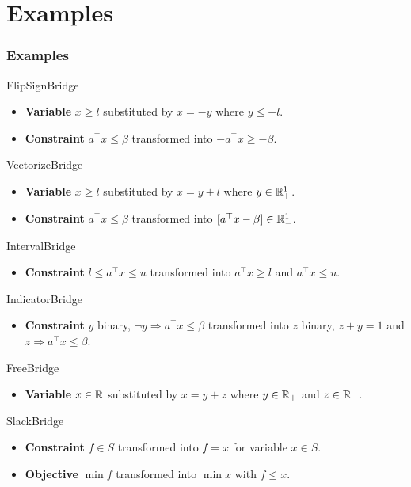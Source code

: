 \documentclass{beamer}
\begin{document}
\section{Examples}

  \begin{frame}[allowframebreaks]
    \frametitle{Examples}
    \begin{block}{FlipSignBridge}
      \begin{itemize}
        \item \textbf{Variable} $x \ge l$ substituted by $x = -y$ where $y \le -l$.
        \item \textbf{Constraint} $a^\top x \le \beta$ transformed into $-a^\top x \ge -\beta$.
      \end{itemize}
    \end{block}
    \begin{block}{VectorizeBridge}
      \begin{itemize}
        \item \textbf{Variable} $x \ge l$ substituted by $x = y + l$ where $y \in \mathbb{R}^1_+$.
        \item \textbf{Constraint} $a^\top x \le \beta$ transformed into $[a^\top x - \beta] \in \mathbb{R}^1_-$.
      \end{itemize}
    \end{block}
    \begin{block}{IntervalBridge}
      \begin{itemize}
        \item \textbf{Constraint} $l \le a^\top x \le u$ transformed into $a^\top x \ge l$ and $a^\top x \le u$.
      \end{itemize}
    \end{block}
    \begin{block}{IndicatorBridge}
      \begin{itemize}
        \item \textbf{Constraint} $y$ binary, $\neg y \Rightarrow a^\top x \le \beta$ transformed into $z$ binary, $z + y = 1$ and $z \Rightarrow a^\top x \le \beta$.
      \end{itemize}
    \end{block}
    \begin{block}{FreeBridge}
      \begin{itemize}
        \item \textbf{Variable} $x \in \mathbb{R}$ substituted by $x = y + z$ where $y \in \mathbb{R}_+$ and $z \in \mathbb{R}_-$.
      \end{itemize}
    \end{block}

    \begin{block}{SlackBridge}
      \begin{itemize}
        \item \textbf{Constraint} $f \in S$ transformed into $f = x$ for variable $x \in S$.
        \item \textbf{Objective} $\min f$ transformed into $\min x$ with $f \le x$.
      \end{itemize}
    \end{block}
  \end{frame}
\end{document}
